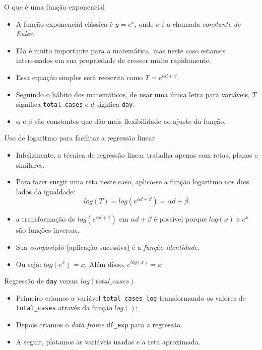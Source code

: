 \documentclass[a4paper,10pt]{beamer}
\begin{document}
\begin{frame}{O que é uma função exponencial}
  \begin{itemize}
      \item A função exponencial clássica é $y = e^x$, onde $e$ é a chamada
	  {\em constante de Euler}.
      \item Ela é muito importante para a matemática, mas neste caso estamos
	  interessados em sua propriedade de crescer muito rapidamente.
      \item Essa equação simples será reescrita como 
	  $T = e^{\alpha d + \beta}$.
      \item Seguindo o hábito dos matemáticos, de usar uma única letra para 
	  variáveis, $T$ significa {\tt total\_cases} e $d$ signfica
	  {\tt day}.
      \item $\alpha$ e $\beta$ são constantes que dão mais flexibilidade 
	  ao ajuste da função.
  \end{itemize}

\end{frame}

\begin{frame}{Uso de logaritmo para facilitar a regressão linear}
  \begin{itemize}
      \item Infelizmente, a técnica de regressão linear trabalha apenas com
	  retas, planos e similares.
      \item Para fazer surgir uma reta neste caso, aplica-se a função 
	  logaritmo nos dois lados da igualdade:
	  \begin{equation*}
	      log(T) = log(e^{\alpha d + \beta}) = \alpha d + \beta.
	  \end{equation*}

      \item a transformação de $log(e^{\alpha d + \beta})$ em $\alpha d + \beta$
	  é possível porque $log(x)$ e $e^x$ são funções inversas.
      \item Sua {\em composição} (aplicação sucessiva) é a 
	  {\em função identidade}.
      \item Ou seja: $log(e^x) = x$. Além disso, $e^{log(x)} = x$
  \end{itemize}

\end{frame}

\begin{frame}{ Regressão de {\tt day} versus $log(total\_cases)$}
  
  
  \begin{itemize}
      \item Primeiro criamos a variável {\tt total\_cases\_log} transformando 
	  os valores de {\tt total\_cases} através da função $log()$;
      \item Depois criamos o {\em data frame} {\tt df\_exp} para a regressão.
      \item A seguir, plotamos as variáveis usadas e a reta aproximada.
  \end{itemize}

\end{frame}
\end{document}
